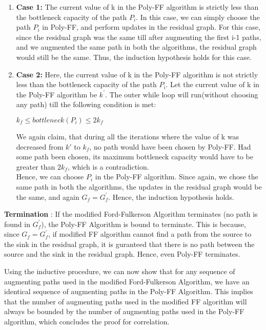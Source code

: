 \documentclass{article}
\begin{document}
\begin{mdframed}
\begin{enumerate}
    \item \textbf{Case 1:} The current value of k in the Poly-FF algorithm is strictly less than the bottleneck capacity of the path $P_{i}$. In this case, we can simply choose the path $P_{i}$ in Poly-FF, and perform updates in the residual graph. For this case, since the residual graph was the same till after augmenting the first i-1 paths, and we augmented the same path in both the algorithms, the residual graph would still be the same. Thus, the induction hypothesis holds for this case.
    \item \textbf{Case 2:} Here, the current value of k in the Poly-FF algorithm is not strictly less than the bottleneck capacity of the path $P_{i}$. Let the current value of k in the Poly-FF algorithm be $k^{'}$.
    The outer while loop will run(without choosing any path) till the following condition is met:
    \begin{center}
        $k_{f} \leq bottleneck(P_{i}) \leq 2k_{f}$
    \end{center}
    We again claim, that during all the iterations where the value of k was decreased from $k'$ to $k_{f}$, no path would have been chosen by Poly-FF. Had some path been chosen, its maximum bottleneck capacity would have to be greater than $2k_{f}$, which is a contradiction. \\
    Hence, we can choose $P_{i}$ in the Poly-FF algorithm. Since again, we chose the same path in both the algorithms, the updates in the residual graph would be the same, and again $G_{f}=G_{f}^{'}$. Hence, the induction hypothesis holds.
\end{enumerate}
\textbf{Termination} : If the modified Ford-Fulkerson Algorithm terminates (no path is found in $G_{f}^{'}$), the Poly-FF Algorithm is bound to terminate. This is because, since $G_{f}=G_{f}^{'}$, if modified FF algorithm cannot find a path from the source to the sink in the residual graph, it is guranteed that there is no path between the source and the sink in the residual graph. Hence, even Poly-FF terminates. 

\end{mdframed}
Using the inductive procedure, we can now show that for any sequence of augmenting paths used in the modified Ford-Fulkerson Algorithm, we have an identical sequence of augmenting paths in the Poly-FF Algorithm. This implies that the number of augmenting paths used in the modified FF algorithm will always be bounded by the number of augmenting paths used in the Poly-FF algorithm, which concludes the proof for correlation. 
\end{document}
